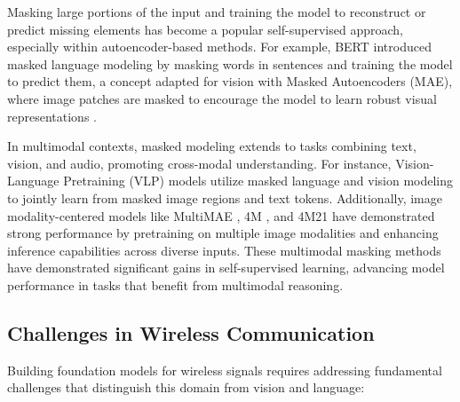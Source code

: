 Masking large portions of the input and training the model to reconstruct or predict missing elements has become a popular self-supervised approach, especially within autoencoder-based methods. For example, BERT \cite{devlin2018bert} introduced masked language modeling by masking words in sentences and training the model to predict them, a concept adapted for vision with Masked Autoencoders (MAE), where image patches are masked to encourage the model to learn robust visual representations \cite{he2021mae}.

In multimodal contexts, masked modeling extends to tasks combining text, vision, and audio, promoting cross-modal understanding. For instance, Vision-Language Pretraining (VLP) models \cite{lu2019vilbert, chen2020uniter, wang2022image} utilize masked language and vision modeling to jointly learn from masked image regions and text tokens. Additionally, image modality-centered models like MultiMAE \cite{bachmann2022multimae}, 4M \cite{mizrahi20244m}, and 4M21 \cite{bachmann20244m} have demonstrated strong performance by pretraining on multiple image modalities and enhancing inference capabilities across diverse inputs. These multimodal masking methods have demonstrated significant gains in self-supervised learning, advancing model performance in tasks that benefit from multimodal reasoning.

\subsection{Challenges in Wireless Communication}

Building foundation models for wireless signals requires addressing fundamental challenges that distinguish this domain from vision and language:

